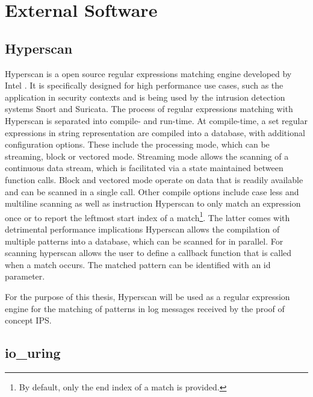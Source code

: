 \section{External Software} \label{sec:software}

\subsection{Hyperscan} \label{sec:hyperscan}
 
Hyperscan is a open source regular expressions matching engine developed by Intel \cite{hyperscan}. 
It is specifically designed for high performance use cases, such as the application in security contexts and is being used by the intrusion detection systems Snort and Suricata.  
The process of regular expressions matching with Hyperscan is separated into compile- and run-time. At compile-time, a set regular expressions in string representation are compiled into a 
database, with additional configuration options. These include the processing mode, which 
can be streaming, block or vectored mode. Streaming mode allows the scanning of a continuous data stream,
which is facilitated via a state maintained between function calls. Block and vectored mode operate on data
that is readily available and can be scanned in a single call. Other compile options include 
case less and multiline scanning as well as instruction Hyperscan to only match an expression
once or to report the leftmost start index of a match\footnote{By default, only the end index of a match is provided.}. The latter comes with detrimental performance implications
Hyperscan allows the compilation
of multiple patterns into a database, which can be scanned for in parallel. 
For scanning hyperscan allows the user to define a callback function that is 
called when a match occurs. The matched pattern can be identified with an id parameter.
\par 
For the purpose of this thesis, Hyperscan will be used as a regular expression engine for
the matching of patterns in log messages received by the proof of concept \ac{IPS}.    

\subsection{io\_uring} \label{sec:io_uring}

